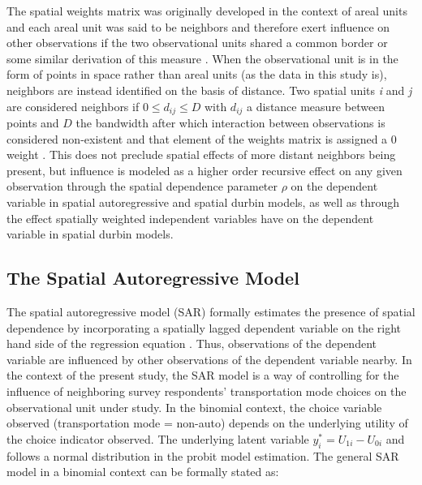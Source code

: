 The spatial weights matrix was originally developed in the context of areal units and each areal unit was said to be neighbors and therefore exert influence on other observations if the two observational units shared a common border or some similar derivation of this measure \cite{cliff1973}.  When the observational unit is in the form of points in space rather than areal units (as the data in this study is), neighbors are instead identified on the basis of distance.  Two spatial units \textit{i} and \textit{j} are considered neighbors if $0 \leq d_{ij} \leq D$ with $d_{ij}$ a distance measure between points and $D$ the bandwidth after which interaction between observations is considered non-existent and that element of the weights matrix is assigned a 0 weight \citep{Anselin1988}.   This does not preclude spatial effects of more distant neighbors being present, but influence is modeled as a higher order recursive effect on any given observation through the spatial dependence parameter $\rho$ on the dependent variable in spatial autoregressive and spatial durbin models, as well as through the effect spatially weighted independent variables have on the dependent variable in spatial durbin models. 

\subsection{The Spatial Autoregressive Model}

The spatial autoregressive model (SAR) formally estimates the presence of spatial dependence by incorporating a spatially lagged dependent variable on the right hand side of the regression equation \cite{cliff1973}. Thus, observations  of the dependent variable are influenced by other observations of the dependent variable nearby.  In the context of the present study, the SAR model is a way of controlling for the influence of neighboring survey respondents' transportation mode choices on the observational unit under study.  In the binomial context, the choice variable observed (transportation mode = non-auto) depends on the underlying utility of the choice indicator observed.  The underlying latent variable $y^{*}_{i} = U_{1i} - U_{0i}$ and follows a normal distribution in the probit model estimation. The general SAR model in a binomial context can be formally stated as:

